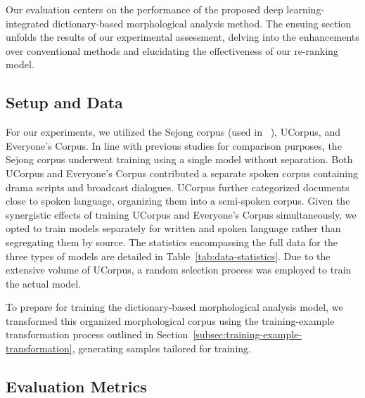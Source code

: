 \documentclass[AMS,STIX2COL]{WileyNJD-v2}
\begin{document}
    Our evaluation centers on the performance of the proposed deep learning-integrated dictionary-based morphological analysis method.
    The ensuing section unfolds the results of our experimental assessment, delving into the enhancements over conventional methods and elucidating the effectiveness of our re-ranking model.

    \subsection{Setup and Data}\label{subsec:setup-and-data}

    For our experiments, we utilized the Sejong corpus (used in ~\cite{MinJW2019, MinJW2020, MinJW2022, MinJW2018, NaSH2015, NaSH2014, NaSH2018, SongHJ2019, SongHJ2020}), UCorpus\cite{UCorpusHG}, and Everyone's Corpus\cite{EveryoneCorpus}.
    In line with previous studies for comparison purposes, the Sejong corpus underwent training using a single model without separation.
    Both UCorpus and Everyone's Corpus contributed a separate spoken corpus containing drama scripts and broadcast dialogues.
    UCorpus further categorized documents close to spoken language, organizing them into a semi-spoken corpus.
    Given the synergistic effects of training UCorpus and Everyone's Corpus simultaneously, we opted to train models separately for written and spoken language rather than segregating them by source.
    The statistics encompassing the full data for the three types of models are detailed in Table~\ref{tab:data-statistics}.
    Due to the extensive volume of UCorpus, a random selection process was employed to train the actual model.

    To prepare for training the dictionary-based morphological analysis model, we transformed this organized morphological corpus using the training-example transformation process outlined in Section~\ref{subsec:training-example-transformation}, generating samples tailored for training.

    \subsection{Evaluation Metrics}\label{subsec:evaluation-metrics}
\end{document}
